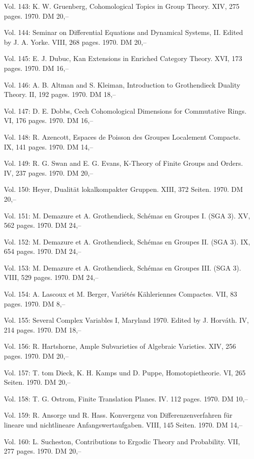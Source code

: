 Vol. 143: K. W. Gruenberg, Cohomological Topics in Group Theory. XIV, 275 pages. 1970. DM 20,--

Vol. 144: Seminar on Differential Equations and Dynamical Systems, II. Edited by J. A. Yorke. VIII, 268 pages. 1970. DM 20,--

Vol. 145: E. J. Dubuc, Kan Extensions in Enriched Category Theory. XVI, 173 pages. 1970. DM 16,--

Vol. 146: A. B. Altman and S. Kleiman, Introduction to Grothendieck Duality Theory. II, 192 pages. 1970. DM 18,--

Vol. 147: D. E. Dobbs, Cech Cohomological Dimensions for Commutative Rings. VI, 176 pages. 1970. DM 16,--

Vol. 148: R. Azencott, Espaces de Poisson des Groupes Localement Compacts. IX, 141 pages. 1970. DM 14,--

Vol. 149: R. G. Swan and E. G. Evans, K-Theory of Finite Groups and Orders. IV, 237 pages. 1970. DM 20,--

Vol. 150: Heyer, Dualität lokalkompakter Gruppen. XIII, 372 Seiten. 1970. DM 20,--

Vol. 151: M. Demazure et A. Grothendieck, Schémas en Groupes I. (SGA 3). XV, 562 pages. 1970. DM 24,--

Vol. 152: M. Demazure et A. Grothendieck, Schémas en Groupes II. (SGA 3). IX, 654 pages. 1970. DM 24,--

Vol. 153: M. Demazure et A. Grothendieck, Schémas en Groupes III. (SGA 3). VIII, 529 pages. 1970. DM 24,--

Vol. 154: A. Lascoux et M. Berger, Variétés Kähleriennes Compactes. VII, 83 pages. 1970. DM 8,--

Vol. 155: Several Complex Variables I, Maryland 1970. Edited by J. Horváth. IV, 214 pages. 1970. DM 18,--

Vol. 156: R. Hartshorne, Ample Subvarieties of Algebraic Varieties. XIV, 256 pages. 1970. DM 20,--

Vol. 157: T. tom Dieck, K. H. Kamps und D. Puppe, Homotopietheorie. VI, 265 Seiten. 1970. DM 20,--

Vol. 158: T. G. Ostrom, Finite Translation Planes. IV. 112 pages. 1970. DM 10,--

Vol. 159: R. Ansorge und R. Hass. Konvergenz von Differenzenverfahren für lineare und nichtlineare Anfangswertaufgaben. VIII, 145 Seiten. 1970. DM 14,--

Vol. 160: L. Sucheston, Contributions to Ergodic Theory and Probability. VII, 277 pages. 1970. DM 20,--

